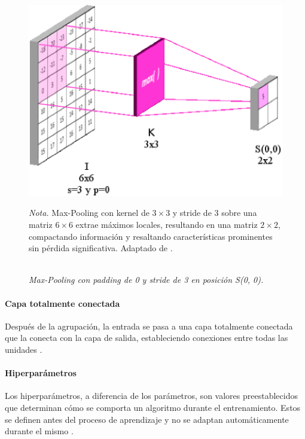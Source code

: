                     \begin{figure}[H] 
                        \caption{\doublespacing \\ \textit{Max-Pooling con padding de 0 y stride de 3 en posición S(0, 0).}} 
                        \centering
                        \includegraphics[width=1\linewidth]{2_CAPITULO0//IMG/max_pooling.png}
                        \begin{justify}
                            \textit{Nota.} Max-Pooling con kernel de \(3 \times 3\) y stride de 3 sobre una matriz \(6 \times 6\) extrae máximos locales, resultando en una matriz \(2 \times 2\), compactando información y resaltando características prominentes sin pérdida significativa. Adaptado de \textcite{Goodfellow2016}.
                        \end{justify}                    
                        \label{max_pooling}
                    \end{figure}
                

                \paragraph{Capa totalmente conectada}
                    Después de la agrupación, la entrada se pasa a una capa totalmente conectada que la conecta con la capa de salida, estableciendo conexiones entre todas las unidades \autocite{Goodfellow2016}.
                
                \paragraph{Hiperparámetros}
                    Los hiperparámetros, a diferencia de los parámetros, son valores preestablecidos que determinan cómo se comporta un algoritmo durante el entrenamiento. Estos se definen antes del proceso de aprendizaje y no se adaptan automáticamente durante el mismo \autocite{Goodfellow2016}.
                    
